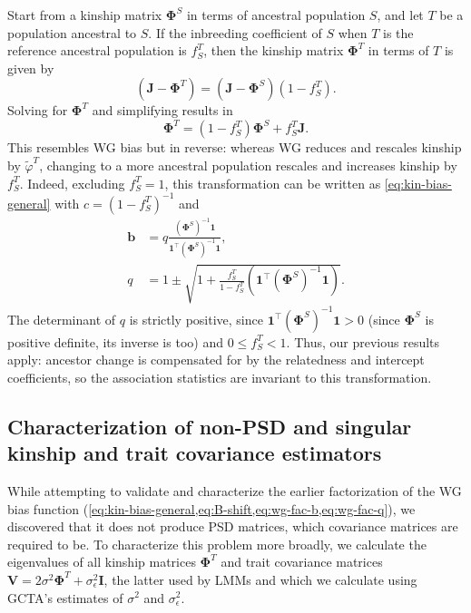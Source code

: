 \documentclass[9pt,twocolumn,twoside]{gsajnl}
\newcommand{\f}[2]{f^{#1}_{#2}}
\newcommand{\kinMat}[1][T]{\mathbf{\Phi}^{#1}}
\begin{document}
Start from a kinship matrix $\kinMat[S]$ in terms of ancestral population $S$, and let $T$ be a population ancestral to $S$.
If the inbreeding coefficient of $S$ when $T$ is the reference ancestral population is $\f{T}{S}$, then the kinship matrix $\kinMat$ in terms of $T$ is given by \citep{ochoa_estimating_2021}
$$
\left( \mathbf{J} - \kinMat \right)
=
\left( \mathbf{J} - \kinMat[S] \right) \left( 1 - \f{T}{S} \right)
.
$$
Solving for $\kinMat$ and simplifying results in
$$
\kinMat
=
\left( 1 - \f{T}{S} \right) \kinMat[S] + \f{T}{S} \mathbf{J}
.
$$
This resembles WG bias but in reverse: whereas WG reduces and rescales kinship by $\tilde{\varphi}^T$, changing to a more ancestral population rescales and increases kinship by $\f{T}{S}$.
Indeed, excluding $\f{T}{S} = 1$, this transformation can be written as \cref{eq:kin-bias-general} with
$c = \left( 1 - \f{T}{S} \right)^{-1}$ and
\begin{align*}
  \mathbf{b}
  &=
    q \frac{ \left( \kinMat[S] \right)^{-1} \mathbf{1} }{ \mathbf{1}^\intercal \left( \kinMat[S] \right)^{-1} \mathbf{1} }
    , \\
  q
  &=
    1 \pm \sqrt{1 + \frac{ \f{T}{S} }{ 1 - \f{T}{S} } \left( \mathbf{1}^\intercal \left( \kinMat[S] \right)^{-1} \mathbf{1} \right) }
    .
\end{align*}
The determinant of $q$ is strictly positive, since $\mathbf{1}^\intercal \left( \kinMat[S] \right)^{-1} \mathbf{1} > 0$ (since $\kinMat[S]$ is positive definite, its inverse is too) and $0 \le \f{T}{S} < 1$.
Thus, our previous results apply: ancestor change is compensated for by the relatedness and intercept coefficients, so the association statistics are invariant to this transformation.

\subsection{Characterization of non-PSD and singular kinship and trait covariance estimators}

While attempting to validate and characterize the earlier factorization of the WG bias function (\cref{eq:kin-bias-general,eq:B-shift,eq:wg-fac-b,eq:wg-fac-q}), we discovered that it does not produce PSD matrices, which covariance matrices are required to be.
To characterize this problem more broadly, we calculate the eigenvalues of all kinship matrices $\kinMat$ and trait covariance matrices $\mathbf{V} = 2 \sigma^2 \kinMat + \sigma^2_\epsilon \mathbf{I}$, the latter used by LMMs and which we calculate using GCTA's estimates of $\sigma^2$ and $\sigma^2_\epsilon$.
\end{document}
